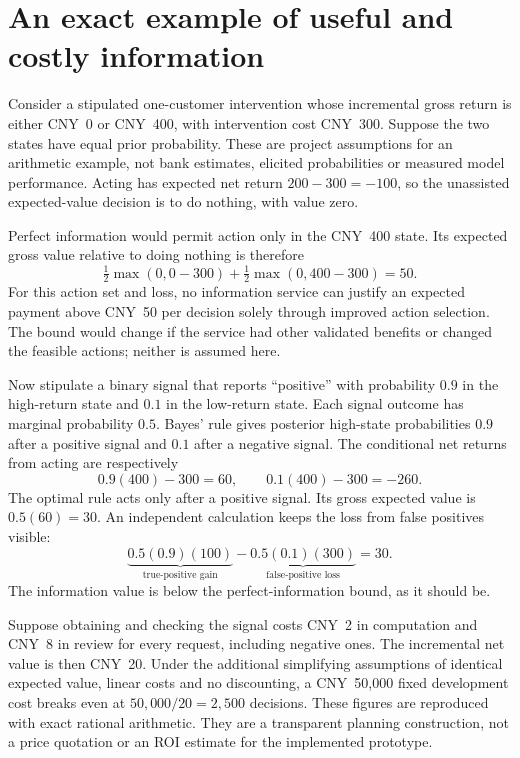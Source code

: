 \section{An exact example of useful and costly information}

Consider a stipulated one-customer intervention whose incremental gross return
is either CNY~0 or CNY~400, with intervention cost CNY~300. Suppose the two
states have equal prior probability. These are project assumptions for an
arithmetic example, not bank estimates, elicited probabilities or measured
model performance. Acting has expected net return $200-300=-100$, so the
unassisted expected-value decision is to do nothing, with value zero.

Perfect information would permit action only in the CNY~400 state. Its expected
gross value relative to doing nothing is therefore
\[
 \tfrac12\max(0,0-300)+\tfrac12\max(0,400-300)=50.
\]
For this action set and loss, no information service can justify an expected
payment above CNY~50 per decision solely through improved action selection.
The bound would change if the service had other validated benefits or changed
the feasible actions; neither is assumed here.

Now stipulate a binary signal that reports ``positive'' with probability $0.9$
in the high-return state and $0.1$ in the low-return state. Each signal outcome
has marginal probability $0.5$. Bayes' rule gives posterior high-state
probabilities $0.9$ after a positive signal and $0.1$ after a negative signal.
The conditional net returns from acting are respectively
\[
 0.9(400)-300=60,\qquad 0.1(400)-300=-260.
\]
The optimal rule acts only after a positive signal. Its gross expected value
is $0.5(60)=30$. An independent calculation keeps the loss from false positives
visible:
\[
 \underbrace{0.5(0.9)(100)}_{\text{true-positive gain}}
 -\underbrace{0.5(0.1)(300)}_{\text{false-positive loss}}=30.
\]
The information value is below the perfect-information bound, as it should be.

Suppose obtaining and checking the signal costs CNY~2 in computation and CNY~8
in review for every request, including negative ones. The incremental net value
is then CNY~20. Under the additional simplifying assumptions of identical
expected value, linear costs and no discounting, a CNY~50,000 fixed development
cost breaks even at $50{,}000/20=2{,}500$ decisions. These figures are reproduced
with exact rational arithmetic. They are a transparent planning construction,
not a price quotation or an ROI estimate for the implemented prototype.

